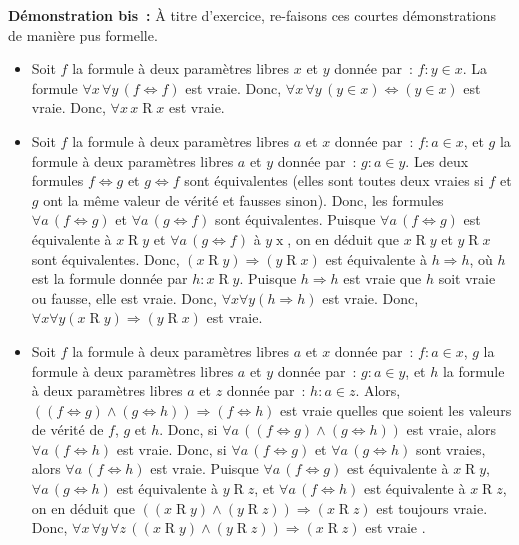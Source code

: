 \noindent\textbf{Démonstration bis :} À titre d'exercice, re-faisons ces courtes démonstrations de manière pus formelle.
\begin{itemize}[nosep]
    \item Soit $f$ la formule à deux paramètres libres $x$ et $y$ donnée par : $f: y \in x$. 
        La formule $\forall x \, \forall y \, (f \Leftrightarrow f)$ est vraie. 
        Donc, $\forall x \, \forall y \, (y \in x) \Leftrightarrow (y \in x)$ est vraie.
        Donc, $\forall x \, x \mathrel{R} x$ est vraie.
    \item Soit $f$ la formule à deux paramètres libres $a$ et $x$ donnée par : $f: a \in x$, et $g$ la formule à deux paramètres libres $a$ et $y$ donnée par : $g: a \in y$. 
        Les deux formules $f \Leftrightarrow g$ et $g \Leftrightarrow f$ sont équivalentes (elles sont toutes deux vraies si $f$ et $g$ ont la même valeur de vérité et fausses sinon). 
        Donc, les formules $\forall a \, (f \Leftrightarrow g)$ et $\forall a \, (g \Leftrightarrow f)$ sont équivalentes. 
        Puisque $\forall a \, (f \Leftrightarrow g)$ est équivalente à $x \mathrel{R} y$ et $\forall a \, (g \Leftrightarrow f)$ à $y \mathrel{x}$, on en déduit que $x \mathrel{R} y$ et $y \mathrel{R} x$ sont équivalentes. 
        Donc, $(x \mathrel{R} y) \Rightarrow (y \mathrel{R} x)$ est équivalente à $h \Rightarrow h$, où $h$ est la formule donnée par $h: x \mathrel{R} y$.
        Puisque $h \Rightarrow h$ est vraie que $h$ soit vraie ou fausse, elle est vraie. 
        Donc, $\forall x \forall y (h \Rightarrow h)$ est vraie.
        Donc, $\forall x \forall y (x \mathrel{R} y) \Rightarrow (y \mathrel{R} x)$ est vraie.
    \item Soit $f$ la formule à deux paramètres libres $a$ et $x$ donnée par : $f: a \in x$, $g$ la formule à deux paramètres libres $a$ et $y$ donnée par : $g: a \in y$, et $h$ la formule à deux paramètres libres $a$ et $z$ donnée par : $h: a \in z$. 
        Alors, $((f \Leftrightarrow g) \wedge (g \Leftrightarrow h)) \Rightarrow (f \Leftrightarrow h)$ est vraie quelles que soient les valeurs de vérité de $f$, $g$ et $h$. 
        Donc, si $\forall a \, ((f \Leftrightarrow g) \wedge (g \Leftrightarrow h))$ est vraie, alors $\forall a \, (f \Leftrightarrow h)$ est vraie.
        Donc, si $\forall a \, (f \Leftrightarrow g)$ et $\forall a \, (g \Leftrightarrow h)$ sont vraies, alors $\forall a \, (f \Leftrightarrow h)$ est vraie.
        Puisque $\forall a \, (f \Leftrightarrow g)$ est équivalente à $x \mathrel{R} y$, $\forall a \, (g \Leftrightarrow h)$ est équivalente à $y \mathrel{R} z$, et $\forall a \, (f \Leftrightarrow h)$ est équivalente à $x \mathrel{R} z$, on en déduit que $((x \mathrel{R} y) \wedge (y \mathrel{R} z)) \Rightarrow (x \mathrel{R} z)$ est toujours vraie.
        Donc, $\forall x \, \forall y \, \forall z \, ((x \mathrel{R} y) \wedge (y \mathrel{R} z)) \Rightarrow (x \mathrel{R} z)$ est vraie .
\end{itemize}

